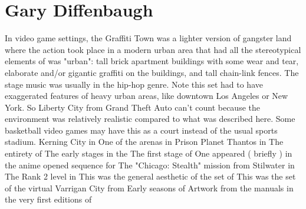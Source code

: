 \documentclass[12pt]{book}
\begin{document}
\chapter{Gary Diffenbaugh}

In video game settings, the Graffiti Town was a lighter version of gangster land where the action took place in a modern urban area that had all the stereotypical elements of was "urban": tall brick apartment buildings with some wear and tear, elaborate and/or gigantic graffiti on the buildings, and tall chain-link fences. The stage music was usually in the hip-hop genre. Note this set had to have exaggerated features of heavy urban areas, like downtown Los Angeles or New York. So Liberty City from Grand Theft Auto can't count because the environment was relatively realistic compared to what was described here. Some basketball video games may have this as a court instead of the usual sports stadium. Kerning City in One of the arenas in Prison Planet Thantos in The entirety of The early stages in the The first stage of One appeared ( briefly ) in the anime opened sequence for The "Chicago: Stealth" mission from Stilwater in The Rank 2 level in This was the general aesthetic of the set of This was the set of the virtual Varrigan City from Early seasons of Artwork from the manuals in the very first editions of
\end{document}
